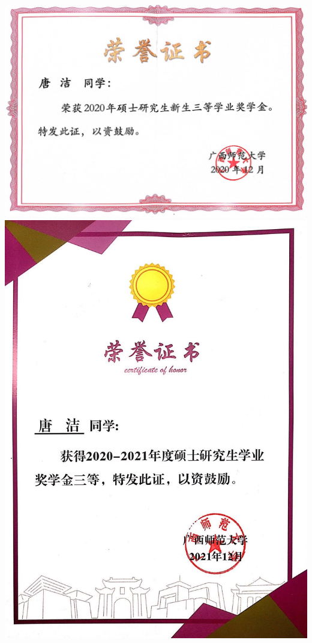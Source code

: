 \documentclass[UFT8]{ctexart}%
\begin{document}
\begin{center}
 \includegraphics[scale=0.25]{figs/2020-12.jpg }
  \includegraphics[scale=0.15]{figs/2021-12.jpg }

\end{center}
\end{document}
